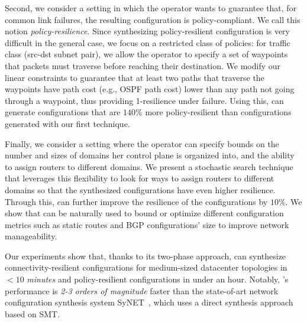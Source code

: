 Second, we consider a setting in which the operator wants to guarantee
that, for common link failures, the resulting configuration is
policy-compliant.  We call this notion \emph{policy-resilience}.
Since synthesizing policy-resilient configuration is very difficult in
the general case, we focus on a {\rm restricted class} of policies:
for traffic class (src-dst subnet pair), we allow the operator to
specify a set of waypoints that packets must traverse before reaching
their destination.  We modify our linear constraints to guarantee that
at least two paths that traverse the waypoints have path cost (e.g.,
OSPF path cost) lower than any path not going through a waypoint, thus
providing 1-resilience under failure. Using this, \name can generate
configurations that are $140\%$ more policy-resilient than
configurations generated with our first technique.

Finally, we consider a setting where the operator can specify bounds
on the number and sizes of domains her control plane is organized
into, and the ability to assign routers to different domains.  We
present a stochastic search technique that leverages this flexibility
to look for ways to assign routers to different domains so that the
synthesized configurations have even higher resilience.  Through this,
\name can further improve the resilience of the configurations by
$10\%$. We show that \name can be naturally used to bound or optimize
different configuration metrics such as static routes and BGP
configurations' size to improve network manageability.

Our experiments show that, thanks to its two-phase approach, \name can
synthesize connectivity-resilient configurations for medium-sized
datacenter topologies in $< 10$ {\em minutes} and policy-resilient configurations
in under an hour.  Notably, \name's performance is {\em 2-3 orders of
  magnitude} faster than the state-of-art network configuration
synthesis system SyNET~\cite{synet}, which uses a direct synthesis
approach based on SMT.

